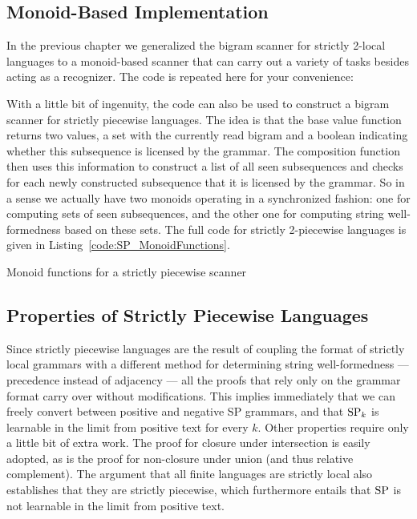 \subsection{Monoid-Based Implementation}

In the previous chapter we generalized the bigram scanner for strictly 2-local languages to a monoid-based scanner that can carry out a variety of tasks besides acting as a recognizer.
The code is repeated here for your convenience:
%
\begin{center}
\end{center}
%
With a little bit of ingenuity, the code can also be used to construct a bigram scanner for strictly piecewise languages.
The idea is that the base value function returns two values, a set with the currently read bigram and a boolean indicating whether this subsequence is licensed by the grammar.
The composition function then uses this information to construct a list of all seen subsequences and checks for each newly constructed subsequence that it is licensed by the grammar.
So in a sense we actually have two monoids operating in a synchronized fashion: one for computing sets of seen subsequences, and the other one for computing string well-formedness based on these sets.
The full code for strictly 2-piecewise languages is given in Listing~\vref{code:SP_MonoidFunctions}.
%
\begin{listing}[tbph]
\caption{Monoid functions for a strictly piecewise scanner}
\label{code:SP_MonoidFunctions}
\end{listing}

\subsection{Properties of Strictly Piecewise Languages}

Since strictly piecewise languages are the result of coupling the format of strictly local grammars with a different method for determining string well-formedness --- precedence instead of adjacency --- all the proofs that rely only on the grammar format carry over without modifications.
This implies immediately that we can freely convert between positive and negative SP grammars, and that $\mathrm{SP}_k$ is learnable in the limit from positive text for every $k$.
Other properties require only a little bit of extra work.
The proof for closure under intersection is easily adopted, as is the proof for non-closure under union (and thus relative complement).
The argument that all finite languages are strictly local also establishes that they are strictly piecewise, which furthermore entails that $\mathrm{SP}$ is not learnable in the limit from positive text.

